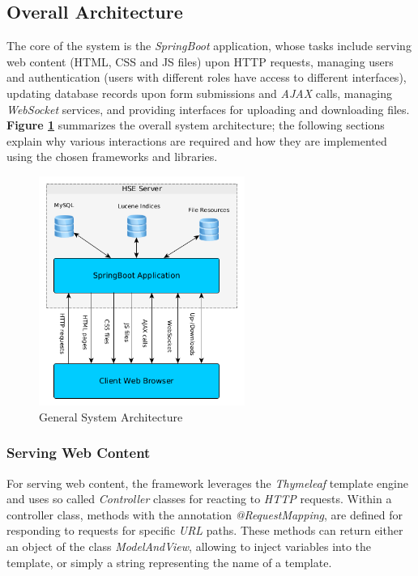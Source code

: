 \documentclass[a4paper]{usiinfbachelorproject}
\begin{document}
\subsection{\textbf{Overall Architecture}} \label{sec:archOverall}

The core of the system is the \emph{SpringBoot} application, whose tasks include serving web content
(HTML, CSS and JS files) upon HTTP requests, managing users and authentication (users with different roles have access to different interfaces),
updating database records upon form submissions and \emph{AJAX} calls, managing \emph{WebSocket} services, and
providing interfaces for uploading and downloading files. \textbf{Figure \ref{fig:archGeneral}} summarizes the
overall system architecture; the following sections explain why various interactions are required and how they are implemented using the
chosen frameworks and libraries.

\begin{figure}[h!]
\centering
\includegraphics[width=0.6\textwidth]{figures/archGeneral}
\caption{General System Architecture}
\label{fig:archGeneral}
\end{figure}

\subsubsection{\textbf{Serving Web Content}}

For serving web content, the framework leverages the \emph{Thymeleaf} \cite{thymeleafHome} template engine and uses so called \emph{Controller}
classes for reacting to \emph{HTTP} requests. Within a controller class, methods with
the annotation \emph{@RequestMapping}, are defined for responding to requests for specific \emph{URL} paths.
These methods can return either an object of the class \emph{ModelAndView}, allowing to inject
variables into the template, or simply a string representing the name of a template. 
\end{document}
